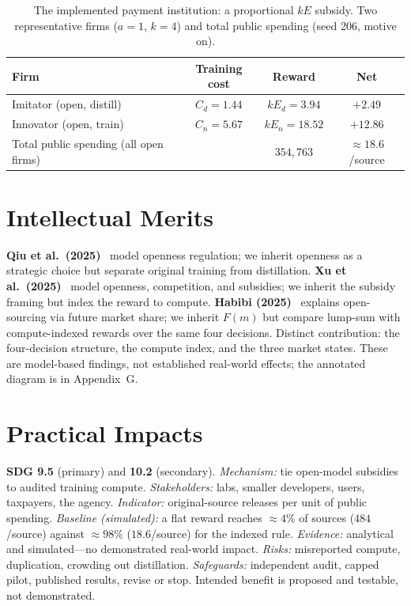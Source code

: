 \begin{table}[h]\caption{The implemented payment institution: a proportional $kE$ subsidy. Two representative firms ($a{=}1$, $k{=}4$) and total public spending (seed 206, motive on).}
\label{tab:pay}
\footnotesize\setlength{\tabcolsep}{4pt}\renewcommand{\arraystretch}{1.0}
\begin{tabularx}{\columnwidth}{@{}p{2.4cm}ccc@{}}
\toprule
\textbf{Firm}&\textbf{Training cost}&\textbf{Reward}&\textbf{Net}\\\midrule
Imitator (open, distill)&$C_d{=}1.44$&$kE_d{=}3.94$&$+2.49$\\
Innovator (open, train)&$C_n{=}5.67$&$kE_n{=}18.52$&$+12.86$\\\midrule
Total public spending (all open firms)&&$354{,}763$&$\approx 18.6$/source\\
\bottomrule
\end{tabularx}\end{table}

\section{Intellectual Merits}
\textbf{Qiu et al.\ (2025)}~\cite{qiu2025} model openness regulation; we inherit openness as a strategic choice but separate original training from distillation. \textbf{Xu et al.\ (2025)}~\cite{xu2025} model openness, competition, and subsidies; we inherit the subsidy framing but index the reward to compute. \textbf{Habibi (2025)}~\cite{habibi2025} explains open-sourcing via future market share; we inherit $F(m)$ but compare lump-sum with compute-indexed rewards over the same four decisions. Distinct contribution: the four-decision structure, the compute index, and the three market states. These are model-based findings, not established real-world effects; the annotated diagram is in Appendix~G.

\section{Practical Impacts}
\textbf{SDG 9.5} (primary) and \textbf{10.2} (secondary). \emph{Mechanism:} tie open-model subsidies to audited training compute. \emph{Stakeholders:} labs, smaller developers, users, taxpayers, the agency. \emph{Indicator:} original-source releases per unit of public spending. \emph{Baseline (simulated):} a flat reward reaches $\approx4\%$ of sources ($484$/source) against $\approx98\%$ ($18.6$/source) for the indexed rule. \emph{Evidence:} analytical and simulated---no demonstrated real-world impact. \emph{Risks:} misreported compute, duplication, crowding out distillation. \emph{Safeguards:} independent audit, capped pilot, published results, revise or stop. Intended benefit is proposed and testable, not demonstrated.

